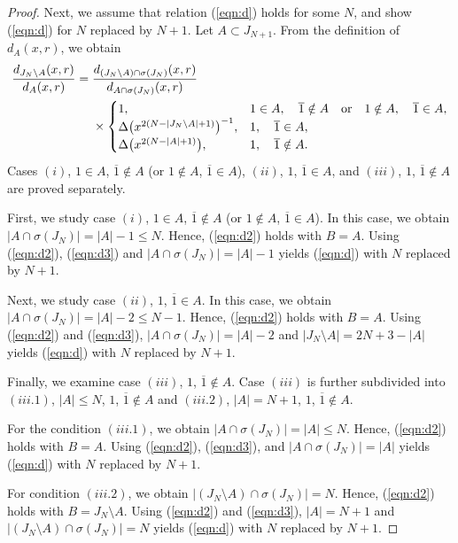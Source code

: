 \documentclass[10pt,a4paper]{amsart}
\numberwithin{equation}{section}
\begin{document}
\begin{proof}
Next, we assume that relation (\ref{eqn:d}) holds for some $N$, and show (\ref{eqn:d})
for $N$ replaced by $N+1$.
Let $A \subset J_{N+1}$.
From the definition of $d_A(x,r)$, we obtain
\begin{align}
\frac{d_{J_N \setminus A}(x,r)}{d_A(x,r)}={}&
\frac{d_{(J_N \setminus A)\cap \sigma(J_N)}(x,r)}{d_{A \cap \sigma(J_N)}(x,r)}\notag
\\
&\times\begin{cases}
1,& 1\in A,\quad \overline{1} \notin A\quad {\rm or}\quad 1\notin A,\quad \overline{1} \in A,
\\
\Delta\big(x^{2(N-|J_N \setminus A|+1)}\big)^{-1},& 1,\quad \overline{1} \in A,
\\
\Delta\big(x^{2(N-|A|+1)}\big),& 1,\quad \overline{1} \notin A.
\end{cases}
\label{eqn:d3}
\end{align}
Cases $(i)$, $1\in A$, $\overline{1} \notin A$ (or $1\notin A$, $\overline{1} \in A$),
$(ii)$, $1$, $\overline{1} \in A$, and $(iii)$, $1$, $\overline{1} \notin A$ are proved separately.

First, we study case $(i)$,
$1\in A$, $\overline{1} \notin A$ (or $1\notin A$, $\overline{1} \in A$).
In this case, we obtain $|A \cap \sigma(J_N)|=|A|-1 \leq N$.
Hence, (\ref{eqn:d2}) holds with $B=A$.
Using (\ref{eqn:d2}), (\ref{eqn:d3}) and $|A \cap \sigma(J_N)|=|A|-1$ yields
(\ref{eqn:d}) with {$N$ replaced by $N+1$}.

Next, we study case $(ii)$, $1$, $\overline{1} \in A$.
In this case, we obtain $|A \cap \sigma(J_N)|=|A|-2 \leq N-1$.
Hence, (\ref{eqn:d2}) holds with $B=A$.
Using (\ref{eqn:d2}) and (\ref{eqn:d3}), $|A \cap \sigma(J_N)|=|A|-2$ and
$|J_N \setminus A|=2N+3-|A|$ yields (\ref{eqn:d}) with {$N$ replaced by $N+1$}.

Finally, we examine case $(iii)$, $1$, $\overline{1} \notin A$.
Case $(iii)$ is further subdivided into $(iii.1)$, $|A|\leq N$, $1$, $\overline{1} \notin A$ and $(iii.2)$, $|A|=N+1$, $1$, $\overline{1} \notin A$.

For the condition $(iii.1)$, we obtain $|A \cap \sigma(J_N)|=|A|\leq N$.
Hence, (\ref{eqn:d2}) holds with $B=A$.
Using (\ref{eqn:d2}), (\ref{eqn:d3}), and $|A \cap \sigma(J_N)|=|A|$ yields
(\ref{eqn:d}) with {$N$ replaced by $N+1$}.

For condition $(iii.2)$, we obtain $|(J_N \setminus A) \cap \sigma(J_N)|=N$.
Hence, (\ref{eqn:d2}) holds with $B=J_N \setminus A$.
Using (\ref{eqn:d2}) and (\ref{eqn:d3}), $|A|=N+1$ and
$|(J_N \setminus A) \cap \sigma(J_N)|=N$ yields
(\ref{eqn:d}) with {$N$ replaced by $N+1$}.
\end{proof}
\end{document}
